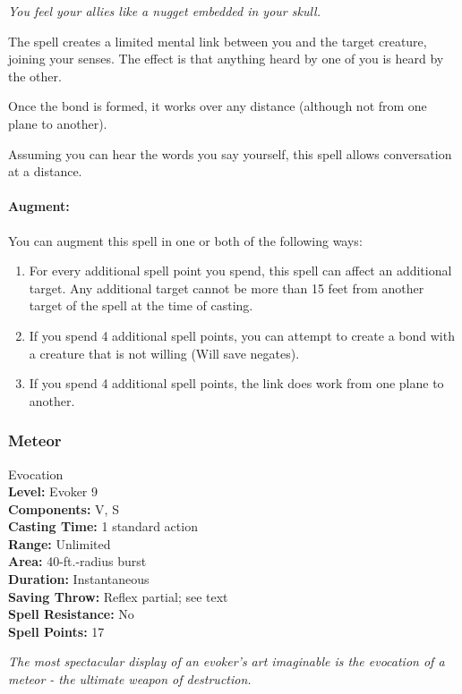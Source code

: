 \emph{You feel your allies like a nugget embedded in your skull.}

The spell creates a limited mental link between you and the target creature, joining your senses.
The effect is that anything heard by one of you is heard by the other.

Once the bond is formed, it works over any distance (although not from one plane to another).

Assuming you can hear the words you say yourself, this spell allows conversation at a distance.

\paragraph{Augment:} You can augment this spell in one or both of the following ways: 
\begin{enumerate}
 \item For every additional spell point you spend, this spell can affect an additional target. 
 Any additional target cannot be more than 15 feet from another target of the spell at the time of casting.
 \item If you spend 4 additional spell points, you can attempt to create a bond with a creature that is not willing (Will save negates).
 \item If you spend 4 additional spell points, the link does work from one plane to another.
\end{enumerate}
\subsubsection{Meteor}
\label{Spell:Meteor}
Evocation
\\ \textbf{Level:} Evoker 9
\\ \textbf{Components:} V, S
\\ \textbf{Casting Time:} 1 standard action
\\ \textbf{Range:} Unlimited
\\ \textbf{Area:} 40-ft.-radius burst
\\ \textbf{Duration:} Instantaneous
\\ \textbf{Saving Throw:} Reflex partial; see text
\\ \textbf{Spell Resistance:} No
\\ \textbf{Spell Points:} 17

\emph{The most spectacular display of an evoker's art imaginable is the evocation of a meteor - the ultimate weapon of destruction.}

